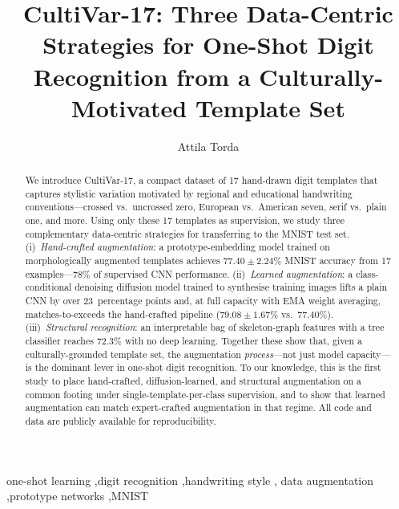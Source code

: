 \documentclass[final,5p,times,twocolumn]{elsarticle}
\begin{document}
\begin{frontmatter}

\title{CultiVar-17: Three Data-Centric Strategies for One-Shot Digit
       Recognition from a Culturally-Motivated Template Set}

\author{Attila Torda}

\begin{abstract}
We introduce CultiVar-17, a compact dataset of 17 hand-drawn digit templates that captures
stylistic variation motivated by regional and educational handwriting conventions—crossed
vs.\ uncrossed zero, European vs.\ American seven, serif vs.\ plain one, and more.
Using only these 17 templates as supervision, we study three complementary data-centric
strategies for transferring to the MNIST test set.
(i)~\emph{Hand-crafted augmentation}: a prototype-embedding model trained on
morphologically augmented templates achieves $77.40 \pm 2.24\%$ MNIST accuracy from 17
examples—78\% of supervised CNN performance.
(ii)~\emph{Learned augmentation}: a class-conditional denoising diffusion model trained
to synthesise training images lifts a plain CNN by over 23~percentage points and, at full
capacity with EMA weight averaging, matches-to-exceeds the hand-crafted pipeline
($79.08 \pm 1.67\%$ vs.\ $77.40\%$).
(iii)~\emph{Structural recognition}: an interpretable bag of skeleton-graph features with a
tree classifier reaches $72.3\%$ with no deep learning.
Together these show that, given a culturally-grounded template set, the augmentation
\emph{process}—not just model capacity—is the dominant lever in one-shot digit recognition.
To our knowledge, this is the first study to place hand-crafted, diffusion-learned, and
structural augmentation on a common footing under single-template-per-class supervision, and
to show that learned augmentation can match expert-crafted augmentation in that regime.
All code and data are publicly available for reproducibility.
\end{abstract}

\begin{keyword}
one-shot learning \sep digit recognition \sep handwriting style \sep
data augmentation \sep prototype networks \sep MNIST
\end{keyword}

\end{frontmatter}

\end{document}

